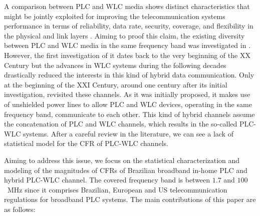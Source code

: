 \documentclass[journal]{IEEEtran}
\begin{document}
A comparison between \ac{PLC} and \ac{WLC} media shows distinct characteristics that might be jointly exploited for improving the telecommunication systems performance in terms of reliability, data rate, security, coverage, and flexibility in the physical and link layers \cite{Dib,Victor2017,Victor2018}. Aiming to proof this claim, the existing diversity between \ac{PLC} and \ac{WLC} media in the same frequency band was investigated in \cite{thiago:hyb, thiago:hyb2, Victor2016, Leo2016}. However, the first investigation of it dates back to the very beginning of the XX Century \cite{Mischa} but the advances in \ac{WLC} systems during the following decades drastically reduced the interests in this kind of hybrid data communication. Only at the beginning of the XXI Century, around one century after its initial investigation, \cite{thiago:hyb} revisited these channels. As it was initially proposed, it makes use of unshielded power lines to allow \ac{PLC} and \ac{WLC} devices, operating in the same frequency band, communicate to each other. %
This kind of hybrid channels assume 
the concatenation of \ac{PLC} and \ac{WLC} channels, which results in the so-called \ac{PLC}-\ac{WLC} systems. After a careful review in the literature, we can see a lack of statistical model for the \ac{CFR} of \ac{PLC}-\ac{WLC} channels.%

Aiming to address this issue, we focus on the statistical characterization and modeling of the magnitudes of \acp{CFR} of Brazilian broadband in-home \ac{PLC} and hybrid \ac{PLC}-\ac{WLC} channel. %
The covered frequency band is between $1.7$ and $100$~MHz since it comprises Brazilian, European and US telecommunication regulations for broadband \ac{PLC} systems. The main contributions of this paper are as follows:
\end{document}
